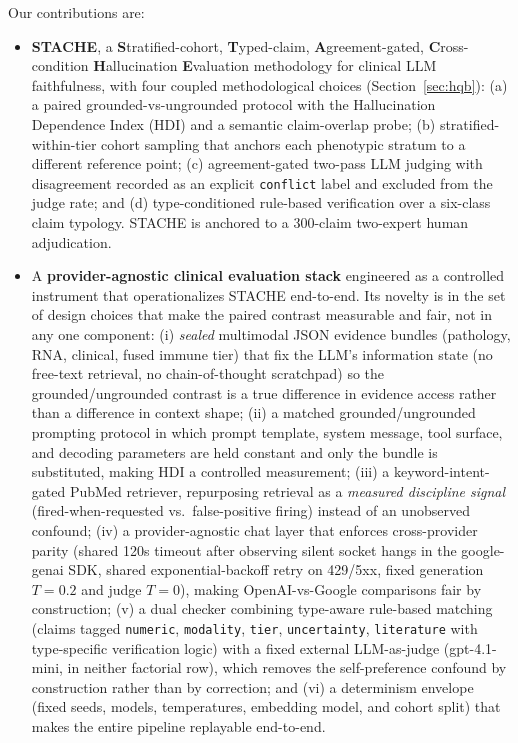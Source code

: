 \documentclass[11pt]{article}
\begin{document}
Our contributions are:
\begin{itemize}
\item \textbf{STACHE}, a \textbf{S}tratified-cohort, \textbf{T}yped-claim, \textbf{A}greement-gated, \textbf{C}ross-condition \textbf{H}allucination \textbf{E}valuation methodology for clinical LLM faithfulness, with four coupled methodological choices (Section~\ref{sec:hqb}): (a) a paired grounded-vs-ungrounded protocol with the Hallucination Dependence Index (HDI) and a semantic claim-overlap probe; (b) stratified-within-tier cohort sampling that anchors each phenotypic stratum to a different reference point; (c) agreement-gated two-pass LLM judging with disagreement recorded as an explicit \texttt{conflict} label and excluded from the judge rate; and (d) type-conditioned rule-based verification over a six-class claim typology. STACHE is anchored to a 300-claim two-expert human adjudication.
\item A \textbf{provider-agnostic clinical evaluation stack} engineered as a controlled instrument that operationalizes STACHE end-to-end. Its novelty is in the set of design choices that make the paired contrast measurable and fair, not in any one component: (i) \emph{sealed} multimodal JSON evidence bundles (pathology, RNA, clinical, fused immune tier) that fix the LLM's information state (no free-text retrieval, no chain-of-thought scratchpad) so the grounded/ungrounded contrast is a true difference in evidence access rather than a difference in context shape; (ii) a matched grounded/ungrounded prompting protocol in which prompt template, system message, tool surface, and decoding parameters are held constant and only the bundle is substituted, making HDI a controlled measurement; (iii) a keyword-intent-gated PubMed retriever, repurposing retrieval as a \emph{measured discipline signal} (fired-when-requested vs.\ false-positive firing) instead of an unobserved confound; (iv) a provider-agnostic chat layer that enforces cross-provider parity (shared 120s timeout after observing silent socket hangs in the google-genai SDK, shared exponential-backoff retry on 429/5xx, fixed generation $T{=}0.2$ and judge $T{=}0$), making OpenAI-vs-Google comparisons fair by construction; (v) a dual checker combining type-aware rule-based matching (claims tagged \texttt{numeric}, \texttt{modality}, \texttt{tier}, \texttt{uncertainty}, \texttt{literature} with type-specific verification logic) with a fixed external LLM-as-judge (gpt-4.1-mini, in neither factorial row), which removes the \citet{panickssery2024llm} self-preference confound by construction rather than by correction; and (vi) a determinism envelope (fixed seeds, models, temperatures, embedding model, and cohort split) that makes the entire pipeline replayable end-to-end.

\end{itemize}
\end{document}

